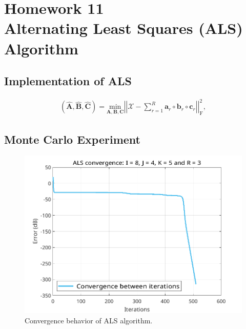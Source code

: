 \documentclass[a4paper,10pt]{article}
\begin{document}
\newpage
\section*{Homework 11 \\ Alternating Least Squares (ALS) Algorithm}

    \subsection*{Implementation of ALS}

    \begin{align}
        \left(\hat{\boldsymbol{A}}, \hat{\boldsymbol{B}}, \hat{\boldsymbol{C}}\right) = \underset{\boldsymbol{A}, \boldsymbol{B}, \boldsymbol{C}}{\text{min}} \left| \left| \mathcal{X} - \sum^{R}_{r = 1} \boldsymbol{a}_{r} \circ \boldsymbol{b}_{r} \circ \boldsymbol{c}_{r} \right| \right|^{2}_{\text{F}},
    \end{align}

    \subsection*{Monte Carlo Experiment}

    \begin{figure}[ht!]
        \centering 
        \includegraphics[width=0.75\linewidth]{figs/hw11a1.png} \par 
        \caption{Convergence behavior of ALS algorithm.}
        \label{fig:hw11a1} 
    \end{figure}
\end{document}

